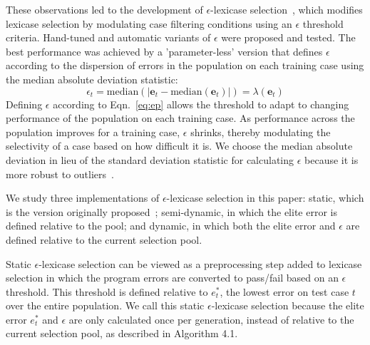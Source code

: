 \documentclass[twoside]{article}
\begin{document}
These observations led to the development of $\epsilon$-lexicase selection~\citep{la_cava_epsilon-lexicase_2016}, which modifies lexicase selection by modulating case filtering conditions using an $\epsilon$ threshold criteria. Hand-tuned and automatic variants of $\epsilon$ were proposed and tested. The best performance was achieved by a 'parameter-less' version that defines $\epsilon$ according to the dispersion of errors in the population on each training case using the median absolute deviation statistic:  
\begin{equation}\label{eq:ep}
\epsilon_t = \text{median}(|\mathbf{e}_t - \text{median}(\mathbf{e}_t)|) = \lambda(\mathbf{e}_t)
\end{equation}
Defining $\epsilon$ according to Eqn.~\ref{eq:ep} allows the threshold to adapt to changing performance of the population on each training case. As performance across the population improves for a training case, $\epsilon$ shrinks, thereby modulating the selectivity of a case based on how difficult it is. We choose the median absolute deviation in lieu of the standard deviation statistic for calculating $\epsilon$ because it is more robust to outliers~\citep{pham-gia_mean_2001}. 

We study three implementations of $\epsilon$-lexicase selection in this paper: static, which is the version originally proposed~\citep{la_cava_automatic_2016}; semi-dynamic, in which the elite error is defined relative to the pool; and dynamic, in which both the elite error and $\epsilon$ are defined relative to the current selection pool. 

Static $\epsilon$-lexicase selection can be viewed as a preprocessing step added to lexicase selection in which the program errors are converted to pass/fail based on an $\epsilon$ threshold. This threshold is defined relative to $e^*_t$, the lowest error on test case $t$ over the entire population. We call this static $\epsilon$-lexicase selection because the elite error $e^*_t$ and $\epsilon$ are only calculated once per generation, instead of relative to the current selection pool, as described in Algorithm 4.1.
\end{document}

